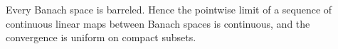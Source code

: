 Every Banach space is barreled. Hence the pointwise limit of a sequence of continuous linear maps between Banach spaces is continuous, and the convergence is uniform on compact subsets.
